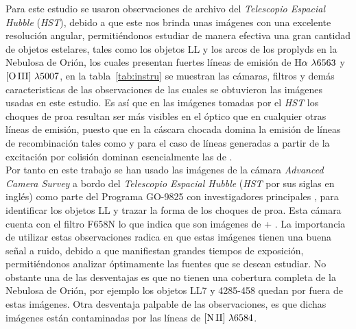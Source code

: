 % 



% 


\label{chap:datos}

Para este estudio se usaron observaciones de archivo del \textit{Telescopio Espacial Hubble} (\textit{HST}), debido a que este nos brinda unas imágenes con una excelente resolución angular, permitiéndonos estudiar de manera efectiva una gran cantidad de objetos estelares, tales como los objetos LL y los arcos de los proplyds en la Nebulosa de Orión, los cuales presentan fuertes líneas de emisión de \(\mathrm{H}\alpha{}~\lambda6563\) y \(\mathrm{[O\,III]}{}~\lambda5007\), en la tabla~\ref{tab:instru} se muestran las cámaras, filtros y demás caracteristicas de las observaciones de las cuales se obtuvieron las imágenes usadas en este estudio. Es así que en las  imágenes tomadas por el \textit{HST} los choques de proa resultan ser más visibles en el óptico que en cualquier otras líneas de emisión, puesto que en la cáscara chocada domina la emisión de líneas de recombinación tales como \ha{} y para el caso de líneas generadas a partir de la excitación por colisión dominan esencialmente las de \oiii{}.\\ 

 Por tanto en este trabajo se han usado las imágenes de la cámara \textit{Advanced Camera Survey} a bordo del \textit{Telescopio Espacial Hubble} (\textit{HST} por sus siglas en inglés) como parte del Programa GO-9825 con investigadores principales \citet{Bally:2006a}, para identificar los objetos LL y trazar la forma de los choques de proa. Esta cámara cuenta con el filtro F658N lo que indica que son imágenes de \ha{} + \nii{}. La importancia de utilizar estas observaciones radica en que estas imágenes tienen una  buena señal a ruido, debido a que manifiestan grandes tiempos de exposición, permitiéndonos analizar óptimamente las fuentes que se desean estudiar. No obstante una de las desventajas es que no tienen una cobertura completa de la Nebulosa de Orión, por ejemplo los objetos LL7 y 4285-458 quedan por fuera de estas imágenes. Otra desventaja palpable de las observaciones, es que dichas imágenes están contaminadas por las líneas de \(\mathrm{[N\,II]}{}~\lambda6584\).\\

